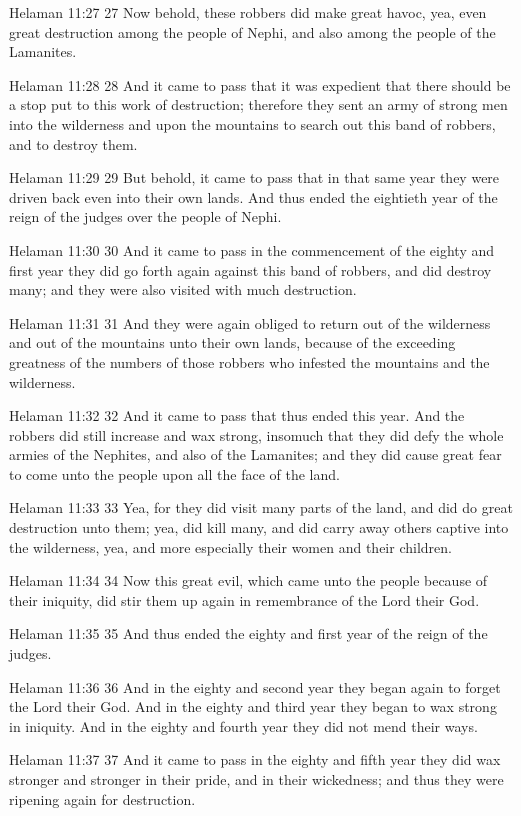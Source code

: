 Helaman 11:27
 27 Now behold, these robbers did make great havoc, yea, even
great destruction among the people of Nephi, and also among the
people of the Lamanites.

Helaman 11:28
 28 And it came to pass that it was expedient that there should
be a stop put to this work of destruction; therefore they sent an
army of strong men into the wilderness and upon the mountains to
search out this band of robbers, and to destroy them.

Helaman 11:29
 29 But behold, it came to pass that in that same year they were
driven back even into their own lands. And thus ended the
eightieth year of the reign of the judges over the people of
Nephi.

Helaman 11:30
 30 And it came to pass in the commencement of the eighty and
first year they did go forth again against this band of robbers,
and did destroy many; and they were also visited with much
destruction.

Helaman 11:31
 31 And they were again obliged to return out of the wilderness
and out of the mountains unto their own lands, because of the
exceeding greatness of the numbers of those robbers who infested
the mountains and the wilderness.

Helaman 11:32
 32 And it came to pass that thus ended this year. And the
robbers did still increase and wax strong, insomuch that they did
defy the whole armies of the Nephites, and also of the Lamanites;
and they did cause great fear to come unto the people upon all
the face of the land.

Helaman 11:33
 33 Yea, for they did visit many parts of the land, and did do
great destruction unto them; yea, did kill many, and did carry
away others captive into the wilderness, yea, and more especially
their women and their children.

Helaman 11:34
 34 Now this great evil, which came unto the people because of
their iniquity, did stir them up again in remembrance of the Lord
their God.

Helaman 11:35
 35 And thus ended the eighty and first year of the reign of the
judges.

Helaman 11:36
 36 And in the eighty and second year they began again to forget
the Lord their God. And in the eighty and third year they began
to wax strong in iniquity. And in the eighty and fourth year
they did not mend their ways.

Helaman 11:37
 37 And it came to pass in the eighty and fifth year they did wax
stronger and stronger in their pride, and in their wickedness;
and thus they were ripening again for destruction.


